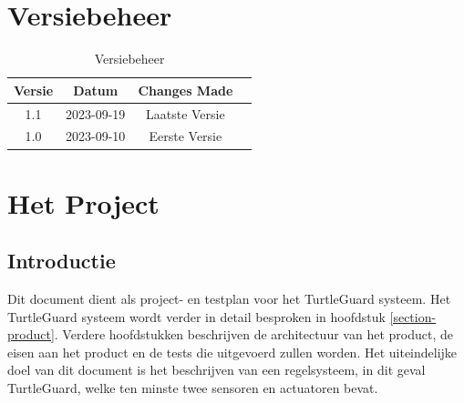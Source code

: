 \documentclass[a4paper]{report}
\newcommand{\turtleguard}{\mbox{TurtleGuard\texttrademark}\xspace}
\begin{document}
\tableofcontents

\chapter*{Versiebeheer}
\thispagestyle{empty}  %
\begin{table}[h]
    \centering
    \begin{tabular}{|c|c|c|p{5cm}|}
        \hline
        Versie & Datum      & Changes Made  \\
        \hline
        1.1    & 2023-09-19 & Laatste Versie \\
        \hline
        1.0    & 2023-09-10 & Eerste Versie \\
        \hline
    \end{tabular}
    \caption{Versiebeheer}
\end{table}
\clearpage  %

\chapter{Het Project}
\section{Introductie}
Dit document dient als project- en testplan voor het \turtleguard systeem. Het \turtleguard systeem wordt verder in detail besproken in hoofdstuk \ref{section-product}.
Verdere hoofdstukken beschrijven de architectuur van het product, de eisen aan het product en de tests die uitgevoerd zullen worden.
Het uiteindelijke doel van dit document is het beschrijven van een regelsysteem, in dit geval \turtleguard, welke ten minste twee sensoren en actuatoren bevat. 
\end{document}
